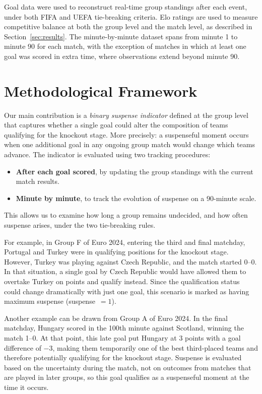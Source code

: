 \documentclass[11pt]{article}
\begin{document}
Goal data were used to reconstruct real-time group standings after each event, under both FIFA and UEFA tie-breaking criteria. Elo ratings are used to measure competitive balance at both the group level and the match level, as described in Section~\ref{sec:results}. The minute-by-minute dataset spans from minute 1 to minute 90 for each match, with the exception of matches in which at least one goal was scored in extra time, where observations extend beyond minute 90.


\section{Methodological Framework}
\label{sec:estimation}

Our main contribution is a \textit{binary suspense indicator} defined at the group level that captures whether a single goal could alter the composition of teams qualifying for the knockout stage. More precisely: a suspenseful moment occurs when one additional goal in any ongoing group match would change which teams advance. The indicator is evaluated using two tracking procedures:

\begin{itemize}
    \item \textbf{After each goal scored}, by updating the group standings with the current match results.
    \item \textbf{Minute by minute}, to track the evolution of suspense on a 90-minute scale.
\end{itemize}

This allows us to examine how long a group remains undecided, and how often suspense arises, under the two tie-breaking rules.

For example, in Group F of Euro 2024, entering the third and final matchday, Portugal and Turkey were in qualifying positions for the knockout stage. However, Turkey was playing against Czech Republic, and the match started 0--0. In that situation, a single goal by Czech Republic would have allowed them to overtake Turkey on points and qualify instead. Since the qualification status could change dramatically with just one goal, this scenario is marked as having maximum suspense (suspense~$= 1$).

Another example can be drawn from Group A of Euro 2024. In the final matchday, Hungary scored in the 100th minute against Scotland, winning the match 1--0. At that point, this late goal put Hungary at 3 points with a goal difference of $-3$, making them temporarily one of the best third-placed teams and therefore potentially qualifying for the knockout stage. Suspense is evaluated based on the uncertainty during the match, not on outcomes from matches that are played in later groups, so this goal qualifies as a suspenseful moment at the time it occurs.
\end{document}
